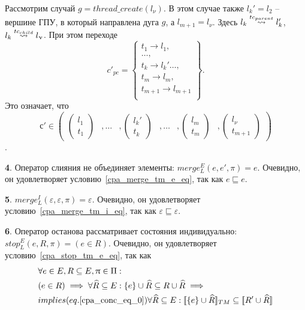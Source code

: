 Рассмотрим случай $g = thread\_create(l_\nu)$. В этом случае также $l_k' = l_2$ -- вершине ГПУ, в который направлена дуга $g$, а $l_{m+1} = l_\nu$. Здесь $l_k \stackrel{tc_{parent}}{\leadsto} l_k'$, $l_k \stackrel{tc_{child}}{\leadsto} l_\upnu$. При этом переходе $$ c'_{pc} = 
\left\lbrace
\begin{array}{c}
t_1 \to l_1,\\
\dots,\\
t_k \to l_k'
\dots,\\
t_m \to l_m,\\
t_{m+1} \to l_{m+1}\\
\end{array}
\right\rbrace.$$ Это означает, что $$с' \in \begin{pmatrix}
\begin{pmatrix}
l_1 \\
t_1 
\end{pmatrix}& ,
\dots& ,
\begin{pmatrix}
l_k' \\
t_k 
\end{pmatrix}& ,
\dots& ,
\begin{pmatrix}
l_m \\
t_m 
\end{pmatrix}& ,
\begin{pmatrix}
l_\nu \\
t_{m+1} 
\end{pmatrix}
\end{pmatrix}$$.


{\textbf 4.} Оператор слияния не объединяет элементы: $merge^E_L(e, e', \pi) = e$. Очевидно, он удовлетворяет условию~\ref{cpa_merge_tm_e_eq}, так как $e \sqsubseteq e$.

{\textbf 5.} $merge^I_L(\varepsilon, \varepsilon, \pi) = \varepsilon$. Очевидно, он удовлетворяет условию~\ref{cpa_merge_tm_i_eq}, так как $\varepsilon \sqsubseteq \varepsilon$.

{\textbf 6.} Оператор останова рассматривает состояния индивидуально: $stop^E_L(e, R, \pi) = (e \in R)$. Очевидно, он удовлетворяет условию~\ref{cpa_stop_tm_e_eq}, так как
\begin{align}
&\forall e \in E, R \subseteq E, \uppi \in \Pi: \nonumber \\
& (e \in R) \implies \forall \widehat{R} \subseteq E: \{e\} \cup \widehat{R} \subseteq R \cup \widehat{R} \implies \nonumber \\
&implies (eq.\ref{cpa_conc_eq_0}) \forall \widehat{R} \subseteq E: [\![ \{e\}\cup \widehat{R} ]\!]_{TM} \subseteq [\![ R' \cup \widehat{R} ]\!]
\end{align}

